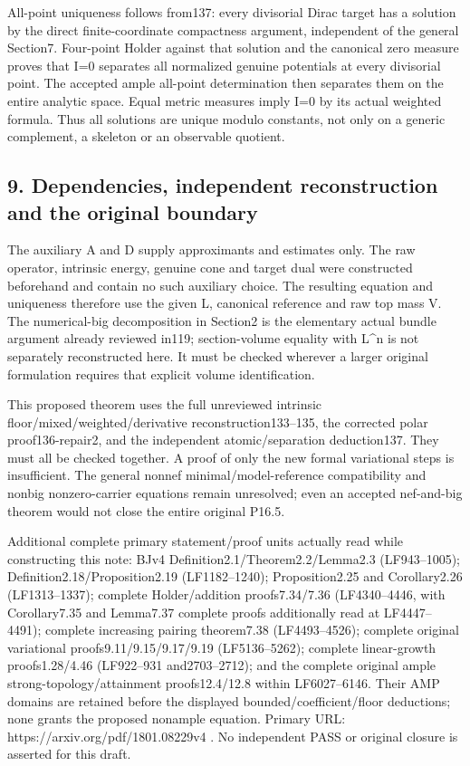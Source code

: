 \documentclass[
  10pt,
]{article}
\begin{document}
All-point uniqueness follows from137: every divisorial Dirac target has
a solution by the direct finite-coordinate compactness argument,
independent of the general Section7. Four-point Holder against that
solution and the canonical zero measure proves that I=0 separates all
normalized genuine potentials at every divisorial point. The accepted
ample all-point determination then separates them on the entire analytic
space. Equal metric measures imply I=0 by its actual weighted formula.
Thus all solutions are unique modulo constants, not only on a generic
complement, a skeleton or an observable quotient.

\subsection{9. Dependencies, independent reconstruction and the original
boundary}\label{dependencies-independent-reconstruction-and-the-original-boundary}

The auxiliary A and D supply approximants and estimates only. The raw
operator, intrinsic energy, genuine cone and target dual were
constructed beforehand and contain no such auxiliary choice. The
resulting equation and uniqueness therefore use the given L, canonical
reference and raw top mass V. The numerical-big decomposition in
Section2 is the elementary actual bundle argument already reviewed
in119; section-volume equality with L\^{}n is not separately
reconstructed here. It must be checked wherever a larger original
formulation requires that explicit volume identification.

This proposed theorem uses the full unreviewed intrinsic
floor/mixed/weighted/derivative reconstruction133--135, the corrected
polar proof136-repair2, and the independent atomic/separation
deduction137. They must all be checked together. A proof of only the new
formal variational steps is insufficient. The general nonnef
minimal/model-reference compatibility and nonbig nonzero-carrier
equations remain unresolved; even an accepted nef-and-big theorem would
not close the entire original P16.5.

Additional complete primary statement/proof units actually read while
constructing this note: BJv4 Definition2.1/Theorem2.2/Lemma2.3
(LF943--1005); Definition2.18/Proposition2.19 (LF1182--1240);
Proposition2.25 and Corollary2.26 (LF1313--1337); complete
Holder/addition proofs7.34/7.36 (LF4340--4446, with Corollary7.35 and
Lemma7.37 complete proofs additionally read at LF4447--4491); complete
increasing pairing theorem7.38 (LF4493--4526); complete original
variational proofs9.11/9.15/9.17/9.19 (LF5136--5262); complete
linear-growth proofs1.28/4.46 (LF922--931 and2703--2712); and the
complete original ample strong-topology/attainment proofs12.4/12.8
within LF6027--6146. Their AMP domains are retained before the displayed
bounded/coefficient/floor deductions; none grants the proposed nonample
equation. Primary URL: https://arxiv.org/pdf/1801.08229v4 . No
independent PASS or original closure is asserted for this draft.
\end{document}

